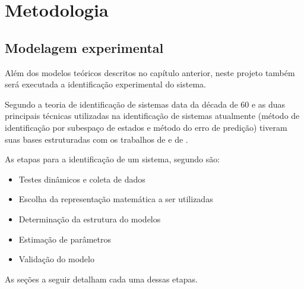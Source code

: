 
\chapter{Metodologia}
\label{ch:metodologia}


\section{Modelagem experimental}
\label{sec:modelagem_experimental}

Além dos modelos teóricos descritos no capítulo anterior, neste projeto também será executada a identificação
experimental do sistema.

Segundo  a teoria de identificação de sistemas data da década de 60 e as duas
principais técnicas utilizadas na identificação de sistemas atualmente (método de identificação por
subespaço de estados e método do erro de predição) tiveram suas bases estruturadas com os trabalhos
de  e de .

As etapas para a identificação de um sistema, segundo  são:
\begin{itemize}
    \item Testes dinâmicos e coleta de dados
    \item Escolha da representação matemática a ser utilizadas
    \item Determinação da estrutura do modelos
    \item Estimação de parâmetros
    \item Validação do modelo
\end{itemize}

As seções a seguir detalham cada uma dessas etapas.

